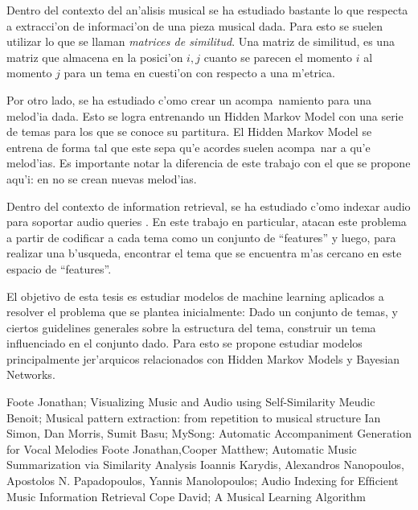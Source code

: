 \documentclass[a4paper,10pt]{article}
\begin{document}
\begin{description}
	
	Dentro del contexto del an'alisis musical se ha estudiado bastante lo que respecta a extracci'on de 
	informaci'on de una pieza musical dada\cite{FXPAL}\cite{BeMe}\cite{FooJoCooMa}. 
	Para esto se suelen utilizar lo que se llaman \emph{matrices de similitud}.  Una matriz de similitud, 
	es una matriz que almacena en la posici'on $i, j$ cuanto se parecen el momento $i$ al momento $j$ 
	para un tema en cuesti'on con respecto a una m'etrica. 


	Por otro lado, se ha estudiado c'omo crear un acompa~namiento para una melod'ia dada\cite{MySong}. 
	Esto se logra entrenando un Hidden Markov Model con una serie de temas para los que se conoce su 
	partitura. El Hidden Markov Model se entrena de forma tal que este sepa qu'e acordes suelen acompa~nar 
	a qu'e melod'ias.  Es importante notar la diferencia de este trabajo con el que se propone aqu'i: 
	en \cite{MySong} no se crean nuevas melod'ias.


	Dentro del contexto de information retrieval, se ha estudiado c'omo indexar audio para soportar audio
	queries \cite{IoAlApYa}. En este trabajo en particular, atacan este problema a partir de codificar a cada 
	tema como un conjunto de ``features'' y luego, para realizar una b'usqueda, encontrar el tema que 
	se encuentra m'as cercano en este espacio de ``features''. 


	El objetivo de esta tesis es estudiar modelos de machine learning aplicados a resolver el problema que
	se plantea inicialmente: Dado un conjunto de temas, y ciertos guidelines generales sobre la estructura
	del tema, construir un tema influenciado en el conjunto dado. Para esto se propone estudiar modelos 
	principalmente jer'arquicos relacionados con Hidden Markov Models y Bayesian Networks.

 \end{description}

\begin{thebibliography}{99}
 Foote Jonathan; Visualizing Music and Audio using Self-Similarity
 Meudic Benoit; Musical pattern extraction: from repetition to musical structure
 Ian Simon, Dan Morris, Sumit Basu; MySong: Automatic Accompaniment Generation for Vocal Melodies
Foote Jonathan,Cooper Matthew; Automatic Music Summarization via Similarity Analysis
Ioannis Karydis, Alexandros Nanopoulos, Apostolos N. Papadopoulos, Yannis Manolopoulos; Audio Indexing for Efﬁcient Music Information Retrieval
 Cope David; A Musical Learning Algorithm


\end{thebibliography}
\end{document}
